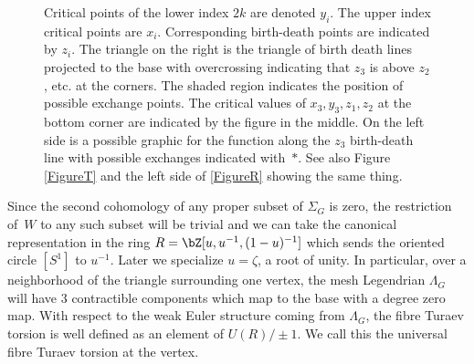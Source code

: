 \begin{figure}[htbp]
\begin{center}
\caption{\smaller Critical points of the lower index $2k$ are denoted $y_i$. The upper index critical points are $x_i$. Corresponding birth-death points are indicated by $z_i$. The triangle on the right is the triangle of birth death lines projected to the base with overcrossing indicating that $z_3$ is above $z_2$, etc. at the corners. The shaded region indicates the position of possible exchange points. The critical values of $x_3,y_3,z_1,z_2$ at the bottom corner are indicated by the figure in the middle. On the left side is a possible graphic for the function along the $z_3$ birth-death line with possible exchanges indicated with~$\ast$. See also Figure \ref{FigureT} and the left side of \ref{FigureR} showing the same thing.
}
\label{Fig: birth-death triangle}
\end{center}
\end{figure}

Since the second cohomology of any proper subset of $\Sigma_G$ is zero, the restriction of~$W$ to any such subset will be trivial and we can take the canonical representation in the ring $R=\bZ[u,u^{-1},(1-u)^{-1}]$ which sends the oriented circle $[S^1]$ to $u^{-1}$. Later we specialize $u=\zeta$, a root of unity. In particular, over a neighborhood of the triangle surrounding one vertex, the mesh Legendrian $\Lambda_G$ will have 3 contractible components which map to the base with a degree zero map. With respect to the weak Euler structure coming from $\Lambda_G$, the fibre Turaev torsion is well defined as an element of $U(R)/\pm1$.
We call this the universal fibre Turaev torsion at the vertex.

